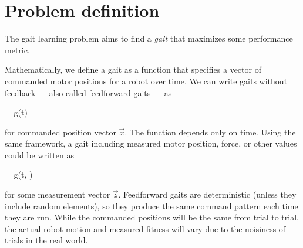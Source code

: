 \section{Problem definition}
%
%
%
%
%


The gait learning problem aims to find a \emph{gait} that maximizes
some performance metric.

Mathematically, we define a gait as a function that specifies
a vector of commanded motor positions for a robot over time.
We can write gaits without feedback --- also called feedforward gaits
--- as

\be
{} = g(t)
\ee

\noindent for commanded position vector $\vec{x}$.  The
function depends only on time.  Using the same framework, a gait
including measured motor position, force, or other values could be
written as

\be
{} = g(t, )
\ee

\noindent for some measurement vector $\vec{z}$.  Feedforward gaits
are deterministic (unless they include random elements), so they
produce the same command pattern each time they are run.  While the
commanded positions will be the same from trial to trial, the actual
robot motion and measured fitness will vary due to the noisiness of
trials in the real world.

